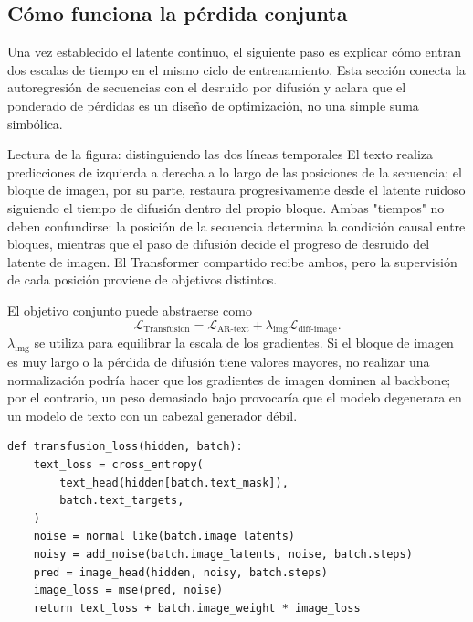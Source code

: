 \subsection{Cómo funciona la pérdida conjunta}

Una vez establecido el latente continuo, el siguiente paso es explicar cómo entran dos escalas de tiempo en el mismo ciclo de entrenamiento. Esta sección conecta la autoregresión de secuencias con el desruido por difusión y aclara que el ponderado de pérdidas es un diseño de optimización, no una simple suma simbólica.


\begin{knowledgebox}{Lectura de la figura: distinguiendo las dos líneas temporales}
El texto realiza predicciones de izquierda a derecha a lo largo de las posiciones de la secuencia; el bloque de imagen, por su parte, restaura progresivamente desde el latente ruidoso siguiendo el tiempo de difusión dentro del propio bloque. Ambas "tiempos" no deben confundirse: la posición de la secuencia determina la condición causal entre bloques, mientras que el paso de difusión decide el progreso de desruido del latente de imagen. El Transformer compartido recibe ambos, pero la supervisión de cada posición proviene de objetivos distintos.
\end{knowledgebox}

El objetivo conjunto puede abstraerse como
$$
\mathcal{L}_{\text{Transfusion}}
=\mathcal{L}_{\text{AR-text}}+\lambda_{\text{img}}\mathcal{L}_{\text{diff-image}}.
$$
$\lambda_{\text{img}}$ se utiliza para equilibrar la escala de los gradientes. Si el bloque de imagen es muy largo o la pérdida de difusión tiene valores mayores, no realizar una normalización podría hacer que los gradientes de imagen dominen al backbone; por el contrario, un peso demasiado bajo provocaría que el modelo degenerara en un modelo de texto con un cabezal generador débil.

\begin{lstlisting}[caption={Objetivo conjunto consciente de la modalidad al estilo Transfusion}]
def transfusion_loss(hidden, batch):
    text_loss = cross_entropy(
        text_head(hidden[batch.text_mask]),
        batch.text_targets,
    )
    noise = normal_like(batch.image_latents)
    noisy = add_noise(batch.image_latents, noise, batch.steps)
    pred = image_head(hidden, noisy, batch.steps)
    image_loss = mse(pred, noise)
    return text_loss + batch.image_weight * image_loss
\end{lstlisting}

